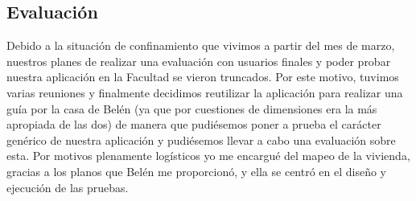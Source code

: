 \subsection{Evaluación}

Debido a la situación de confinamiento que vivimos a partir del mes de marzo, nuestros planes de realizar una evaluación con usuarios finales y poder probar nuestra aplicación en la Facultad se vieron truncados. Por este motivo, tuvimos varias reuniones y finalmente decidimos reutilizar la aplicación para realizar una guía por la casa de Belén (ya que por cuestiones de dimensiones era la más apropiada de las dos) de manera que pudiésemos poner a prueba el carácter genérico de nuestra aplicación y pudiésemos llevar a cabo una evaluación sobre esta. Por motivos plenamente logísticos yo me encargué del mapeo de la vivienda, gracias a los planos que Belén me proporcionó, y ella se centró en el diseño y ejecución de las pruebas. 
